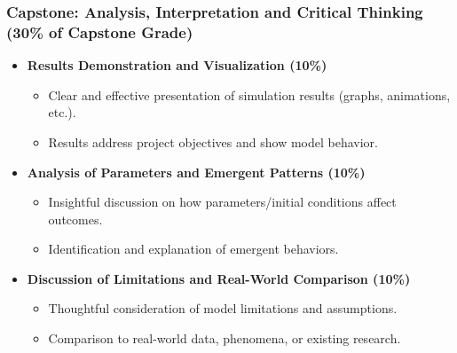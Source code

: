 \documentclass{beamer}
\begin{document}
\begin{frame}[t]
\frametitle{Capstone: Analysis, Interpretation and Critical Thinking (30\% of Capstone Grade)}
\begin{itemize}
    \item \textbf{Results Demonstration and Visualization (10\%)}
    \begin{itemize}
        \item Clear and effective presentation of simulation results (graphs, animations, etc.).
        \item Results address project objectives and show model behavior.
    \end{itemize}
    \vspace{0.5em}
    \item \textbf{Analysis of Parameters and Emergent Patterns (10\%)}
    \begin{itemize}
        \item Insightful discussion on how parameters/initial conditions affect outcomes.
        \item Identification and explanation of emergent behaviors.
    \end{itemize}
    \vspace{0.5em}
    \item \textbf{Discussion of Limitations and Real-World Comparison (10\%)}
    \begin{itemize}
        \item Thoughtful consideration of model limitations and assumptions.
        \item Comparison to real-world data, phenomena, or existing research.
    \end{itemize}
\end{itemize}
\end{frame}

\end{document}
